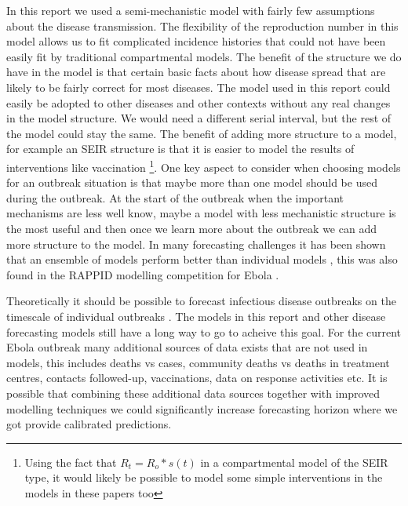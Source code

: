 \documentclass[12pt]{article}
\begin{document}
In this report we used a semi-mechanistic model with fairly few assumptions about the disease transmission. The flexibility of the reproduction number in this model allows us to fit complicated incidence histories that could not have been easily fit by traditional compartmental models. The benefit of the structure we do have in the model is that certain basic facts about how disease spread that are likely to be fairly correct for most diseases. The model used in this report could easily be adopted to other diseases and other contexts without any real changes in the model structure. We would need a different serial interval, but the rest of the model could stay the same. The benefit of adding more structure to a model, for example an SEIR structure is that it is easier to model the results of interventions like vaccination \footnote{Using the fact that $R_t=R_o*s(t)$ in a compartmental model of the SEIR type, it would likely be possible to model some simple interventions in the models in these papers too}. One key aspect to consider when choosing models for an outbreak situation is that maybe more than one model should be used during the outbreak. At the start of the outbreak when the important mechanisms are less well know, maybe a model with less mechanistic structure is the most useful and then once we learn more about the outbreak we can add more structure to the model. In many forecasting challenges it has been shown that an ensemble of models perform better than individual models \cite{dietterichEnsembleMethodsMachine2000}, this was also found in the RAPPID modelling competition for Ebola \cite{viboudRAPIDDEbolaForecasting2018}. 

Theoretically it should be possible to forecast infectious disease outbreaks on the timescale of individual outbreaks \cite{scarpinoPredictabilityInfectiousDisease2019}. The models in this report and other disease forecasting models still have a long way to go to acheive this goal. For the current Ebola outbreak many additional sources of data exists that are not used in models, this includes deaths vs cases, community deaths vs deaths in treatment centres, contacts followed-up, vaccinations, data on response activities etc. It is possible that combining these additional data sources together with improved modelling techniques we could significantly increase forecasting horizon where we got provide calibrated predictions. 




\end{document}
